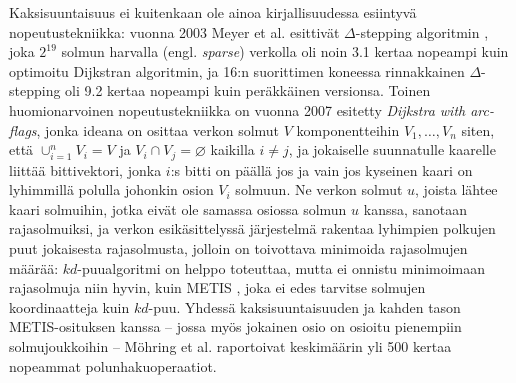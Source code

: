 \documentclass[10pt]{article}
\begin{document}
\noindent Kaksisuuntaisuus ei kuitenkaan ole ainoa kirjallisuudessa esiintyvä nopeutustekniikka: vuonna 2003 Meyer et al. esittivät $\Delta$-stepping algoritmin \cite{Meyer98}, joka $2^{19}$ solmun harvalla (engl. \textit{sparse}) verkolla oli noin 3.1 kertaa nopeampi kuin optimoitu Dijkstran algoritmin, ja 16:n suorittimen koneessa rinnakkainen $\Delta$-stepping oli 9.2 kertaa nopeampi kuin peräkkäinen versionsa. Toinen huomionarvoinen nopeutustekniikka on vuonna 2007 esitetty \textit{Dijkstra with arc-flags}\cite{Mohring07}, jonka ideana on osittaa verkon solmut $V$ komponentteihin $V_1, \dots, V_n$ siten, että $\cup_{i = 1}^n V_i = V$ ja $V_i \cap V_j = \varnothing$ kaikilla $i \neq j$, ja jokaiselle suunnatulle kaarelle liittää bittivektori, jonka $i$:s bitti on päällä jos ja vain jos kyseinen kaari on lyhimmillä polulla johonkin osion $V_i$ solmuun. Ne verkon solmut $u$, joista lähtee kaari solmuihin, jotka eivät ole samassa osiossa solmun $u$ kanssa, sanotaan rajasolmuiksi, ja verkon esikäsittelyssä järjestelmä rakentaa lyhimpien polkujen puut jokaisesta rajasolmusta, jolloin on toivottava minimoida rajasolmujen määrää: $kd$-puualgoritmi on helppo toteuttaa, mutta ei onnistu minimoimaan rajasolmuja niin hyvin, kuin METIS \cite{Karypis98}, joka ei edes tarvitse solmujen koordinaatteja kuin $kd$-puu. Yhdessä kaksisuuntaisuuden ja kahden tason METIS-osituksen kanssa -- jossa myös jokainen osio on osioitu pienempiin solmujoukkoihin -- Möhring et al. raportoivat keskimäärin yli 500 kertaa nopeammat polunhakuoperaatiot.



\end{document}
